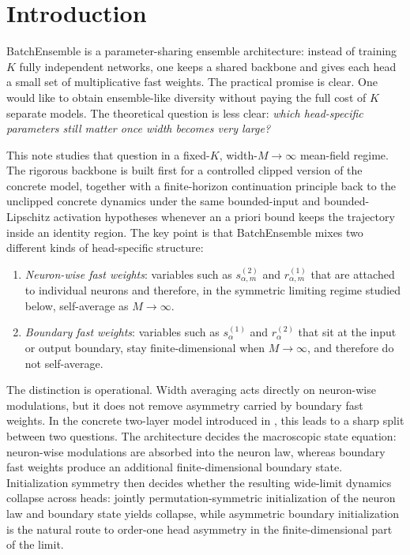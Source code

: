 \documentclass[11pt]{article}
\theoremstyle{definition}
\begin{document}
\section{Introduction}

BatchEnsemble is a parameter-sharing ensemble architecture: instead of training
$K$ fully independent networks, one keeps a shared backbone and gives each head
a small set of multiplicative fast weights. The practical promise is clear. One
would like to obtain ensemble-like diversity without paying the full cost of $K$
separate models. The theoretical question is less clear: \emph{which
head-specific parameters still matter once width becomes very large?}

This note studies that question in a fixed-$K$, width-$M\to\infty$ mean-field
regime. The rigorous backbone is built first for a controlled clipped version
of the concrete model, together with a finite-horizon continuation principle
back to the unclipped concrete dynamics under the same bounded-input and
bounded-Lipschitz activation hypotheses whenever an a priori bound keeps the
trajectory inside an identity region. The key point is
that BatchEnsemble mixes two different kinds of
head-specific structure:
\begin{enumerate}[leftmargin=2em]
  \item \emph{Neuron-wise fast weights}: variables such as
  $s_{\alpha,m}^{(2)}$ and $r_{\alpha,m}^{(1)}$ that are attached to individual
  neurons and therefore, in the symmetric limiting regime studied below,
  self-average as $M\to\infty$.
  \item \emph{Boundary fast weights}: variables such as $s_\alpha^{(1)}$ and
  $r_\alpha^{(2)}$ that sit at the input or output boundary, stay
  finite-dimensional when $M\to\infty$, and therefore do not self-average.
\end{enumerate}
The distinction is operational. Width averaging acts directly on neuron-wise
modulations, but it does not remove asymmetry carried by boundary fast weights.
In the concrete two-layer model introduced in , this leads to
a sharp split between two questions. The architecture decides the macroscopic
state equation: neuron-wise modulations are absorbed into the neuron law,
whereas boundary fast weights produce an additional finite-dimensional boundary
state. Initialization symmetry then decides whether the resulting wide-limit
dynamics collapse across heads: jointly permutation-symmetric initialization of
the neuron law and boundary state yields collapse, while asymmetric boundary
initialization is the natural route to order-one head asymmetry in the
finite-dimensional part of the limit.
\end{document}
